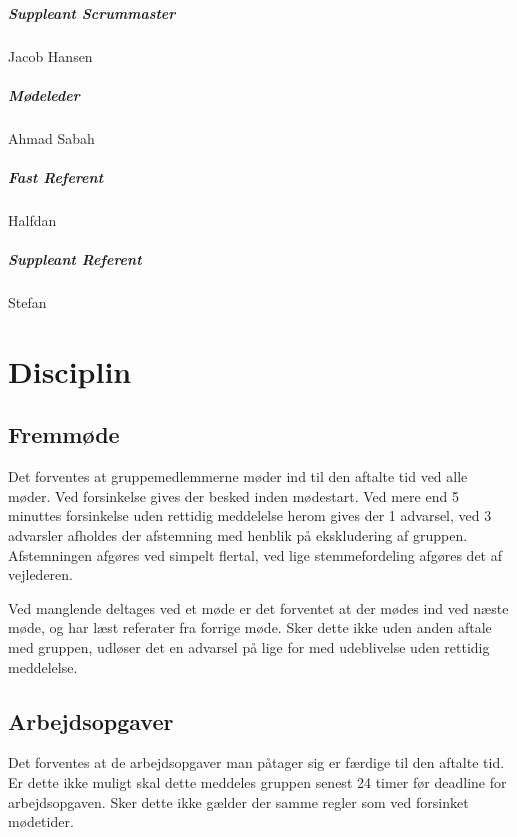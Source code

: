 \documentclass[a4paper,article,11pt,oneside]{memoir}
\begin{document}
\paragraph*{Suppleant Scrummaster} Jacob Hansen
\paragraph*{Mødeleder}
Ahmad Sabah
\paragraph*{Fast Referent}
Halfdan 
\paragraph*{Suppleant Referent}
Stefan
\chapter{Disciplin}
\section{Fremmøde}
Det forventes at gruppemedlemmerne møder ind til den aftalte tid ved alle møder.
Ved forsinkelse gives der besked inden mødestart.  Ved mere end  5 minuttes forsinkelse uden rettidig meddelelse herom gives der 1 advarsel, ved 3 advarsler afholdes der afstemning med henblik på ekskludering af gruppen. Afstemningen afgøres ved simpelt flertal, ved lige stemmefordeling afgøres det af vejlederen.

Ved manglende deltages ved et møde er det forventet at der mødes ind ved næste møde, og har læst referater fra forrige møde. Sker dette ikke uden anden aftale med gruppen, udløser det en advarsel på lige for med udeblivelse uden rettidig meddelelse.

\section{Arbejdsopgaver}
Det forventes at de arbejdsopgaver man påtager sig er færdige til den aftalte tid. Er dette ikke muligt skal dette meddeles gruppen senest 24 timer før deadline for arbejdsopgaven. Sker dette ikke gælder der samme regler som ved forsinket mødetider.



\end{document}
